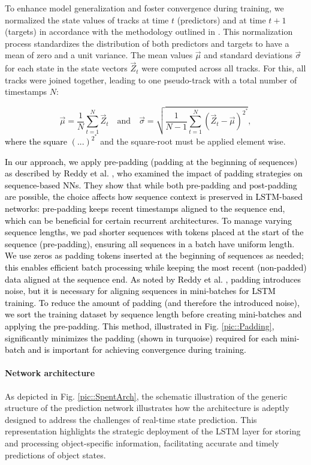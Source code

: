 \documentclass[letterpaper, 10 pt, journal, twoside]{IEEEtran}
\newcommand{\red}[1]{\textcolor{black}{#1}}
\begin{document}
To enhance model generalization and foster convergence during training, we normalized the state values of tracks at time $t$ (predictors) and at time $t+1$ (targets) in accordance with the methodology outlined in {\cite{DL_book.2019}}.
This normalization process standardizes the distribution of both predictors and targets to have a mean of zero and a unit variance.
The mean values $\vec{\mu}$ and standard deviations $\vec{\sigma}$ for each state in the state vectors $\vec{Z}_t$ were computed across all tracks. For this, all tracks were joined together, leading to one pseudo-track with a total number of timestamps $N$:

\begin{equation}
	\vec{\mu} = \frac{1}{N} \sum_{t = 1}^{N} \vec{Z}_t
\quad\text{and}\quad
	\vec{\sigma} = \sqrt{{\frac{1}{N - 1}} \sum_{t = 1}^{N} (\vec{Z}_t - \vec{\mu})^{2^*}},
\end{equation}
\noindent
\red{where the square $(...)^{2^*}$} and the square-root must be applied element wise.

\red{In our approach, we apply pre-padding (padding at the beginning of sequences) as described by Reddy et al. {\cite{DL_padding.2019}}, who examined the impact of padding strategies on sequence-based \acp{NN}.
They show that while both pre-padding and post-padding are possible, the choice affects how sequence context is preserved in \ac{LSTM}-based networks: pre-padding keeps recent timestamps aligned to the sequence end, which can be beneficial for certain recurrent architectures.
To manage varying sequence lengths, we pad shorter sequences with tokens placed at the start of the sequence (pre-padding), ensuring all sequences in a batch have uniform length.
We use zeros as padding tokens inserted at the beginning of sequences as needed; this enables efficient batch processing while keeping the most recent (non-padded) data aligned at the sequence end.
As noted by Reddy et al. {\cite{DL_padding.2019}}, padding introduces noise, but it is necessary for aligning sequences in mini-batches for \ac{LSTM} training. To reduce the amount of padding (and therefore the introduced noise), we sort the training dataset by sequence length before creating mini-batches and applying the pre-padding. This method, illustrated in Fig. {\ref{pic::Padding}}, significantly minimizes the padding (shown in turquoise) required for each mini-batch and is important for achieving convergence during training.}

\paragraph{Network architecture}
As depicted in Fig. \ref{pic::SpentArch}, the schematic illustration of the generic structure of the prediction network illustrates how the architecture is adeptly designed to address the challenges of real-time state prediction.
This representation highlights the strategic deployment of the \ac{LSTM} layer for storing and processing object-specific information, facilitating accurate and timely predictions of object states.
\end{document}
